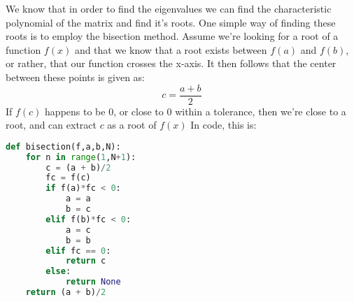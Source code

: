 \documentclass{article}
\begin{document}
We know that in order to find the eigenvalues we can find the characteristic polynomial of the matrix and find it's roots. \newpage
One simple way of finding these roots is to employ the bisection method. 
Assume we're looking for a root of a function $f(x)$ and that we know that a root exists between $f(a)$ and $f(b)$, or rather, that our function crosses the x-axis. It then follows that the center between these points is given as:
\begin{equation*}
    c = \frac{a+b}{2}
\end{equation*} \newline
If $f(c)$ happens to be 0, or close to 0 within a tolerance, then we're close to a root, and can extract $c$ as a root of $f(x)$ \newline
In code, this is:
\begin{lstlisting}[language=Python]
def bisection(f,a,b,N):
    for n in range(1,N+1):
        c = (a + b)/2
        fc = f(c)
        if f(a)*fc < 0:
            a = a
            b = c
        elif f(b)*fc < 0:
            a = c
            b = b
        elif fc == 0:
            return c
        else:
            return None
    return (a + b)/2   
\end{lstlisting}
\newpage
\end{document}
